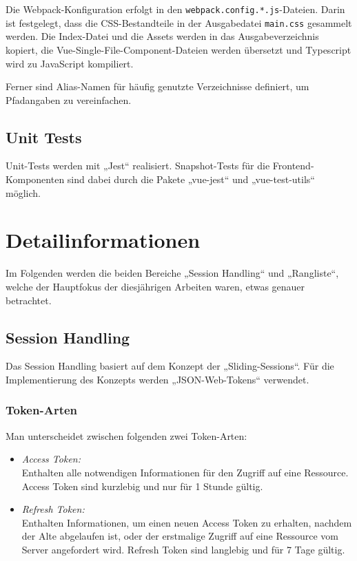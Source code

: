 \documentclass[letterpaper, 10 pt, conference]{ieeeconf}
\begin{document}
Die Webpack-Konfiguration erfolgt in den \texttt{webpack.config.*.js}-Dateien.
Darin ist festgelegt, dass die CSS-Bestandteile in der Ausgabedatei \texttt{main.css} gesammelt werden.
Die Index-Datei und die Assets werden in das Ausgabeverzeichnis kopiert, die Vue-Single-File-Component-Dateien werden übersetzt
und Typescript wird zu JavaScript kompiliert.

Ferner sind Alias-Namen für häufig genutzte Verzeichnisse definiert, um Pfadangaben zu vereinfachen.

\subsection{Unit Tests}

Unit-Tests werden mit „Jest“ realisiert.
Snapshot-Tests für die Frontend-Komponenten sind dabei durch die Pakete „vue-jest“ und „vue-test-utils“ möglich.

\section{Detailinformationen}

Im Folgenden werden die beiden Bereiche „Session Handling“ und „Rangliste“, welche der Hauptfokus der diesjährigen Arbeiten waren, etwas genauer betrachtet.

\subsection{Session Handling}

Das Session Handling basiert auf dem Konzept der „Sliding-Sessions“.  Für die Implementierung des Konzepts werden „JSON-Web-Tokens“\cite{c4} verwendet. 

\subsubsection{Token-Arten}

Man unterscheidet zwischen folgenden zwei Token-Arten:

\begin{itemize}
\item 
\textit{Access Token:}\\
Enthalten alle notwendigen Informationen für den Zugriff auf eine Ressource.  Access Token sind kurzlebig und nur für 1 Stunde gültig.
\item 
\textit{Refresh Token:}\\
Enthalten Informationen, um einen neuen Access Token zu erhalten, nachdem der Alte abgelaufen ist, oder der erstmalige Zugriff auf eine Ressource vom Server angefordert wird.  Refresh Token sind langlebig und für 7 Tage gültig.
\end{itemize}
\end{document}
